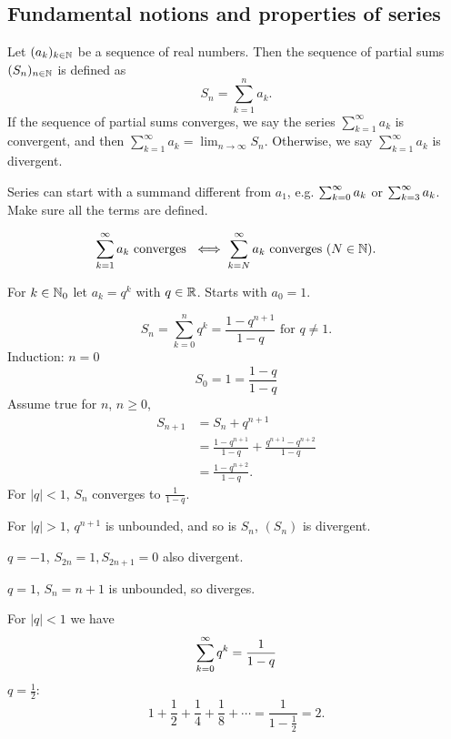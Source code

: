 \documentclass[10pt, a4paper]{article}
\newcommand{\dseq}[2][n]{(#2_#1)_{#1 \in \N}}
\begin{document}
\subsection{Fundamental notions and properties of series}

\begin{definition}
    Let $\dseq[k]{a}$ be a sequence of real numbers.
    Then the sequence of partial sums $\dseq{S}$ is defined as
    \[
    S_n = \sum_{k = 1}^{n}a_k.
    \]
    If the sequence of partial sums converges,
    we say the series $\sum_{k = 1}^{\infty}a_k$ is convergent,
    and then $\sum_{k = 1}^{\infty}a_k = \lim_{n \rightarrow \infty}S_n$.
    Otherwise,
    we say $\sum_{k = 1}^{\infty}a_k$ is divergent.
\end{definition}

\begin{remark}
    Series can start with a summand different from $a_1$,
    e.g.
    $\infsum[k = 0]a_k$ or $\infsum[k = 3]a_k$.
    Make sure all the terms are defined.
\end{remark}

\[
\infsum a_k\text{ converges } \iff \infsum[k = N]a_k\text{ converges } (N \in \N).
\]
\begin{example}
    For $k \in \N_0$ let $a_k = q ^ k$ with $q \in \R$.
    Starts with $a_0 = 1$.

    \[
    S_n = \sum_{k = 0}^{n}q ^ k = \frac{1 - q ^ {n + 1}}{1 - q}\text{ for } q \neq 1.
    \]
    Induction:
    $n = 0$
    \[
    S_0 = 1 = \frac{1 - q}{1 - q}
    \]
    Assume true for $n$, $n \geq 0$,
    \begin{align*}
        S_{n + 1} &= S_n + q ^ {n + 1} \\
        &= \frac{1 - q ^ {n + 1}}{1 - q} + \frac{q ^ {n + 1} - q ^ {n + 2}}{1 - q} \\
        &= \frac{1 - q ^ {n + 2}}{1 - q}.
    \end{align*}
    For $|q| < 1$,
    $S_n$ converges to $\frac{1}{1 - q}$.

    For $|q| > 1$,
    $q ^ {n + 1}$ is unbounded,
    and so is $S_n$,
    $(S_n)$ is divergent.

    $q = -1$,
    $S_{2n} = 1, S_{2n + 1} = 0$ also divergent.
    
    $q = 1$,
    $S_n = n + 1$ is unbounded,
    so diverges.

    For $|q| < 1$ we have
    \[
    \infsum[k = 0]q ^ k = \frac{1}{1 - q}
    \]
    $q = \frac{1}{2}$:
    \[
    1 + \frac{1}{2} + \frac{1}{4} + \frac{1}{8} + \dotsi = \frac{1}{1 - \frac{1}{2}} = 2.
    \]
\end{example}
\end{document}
